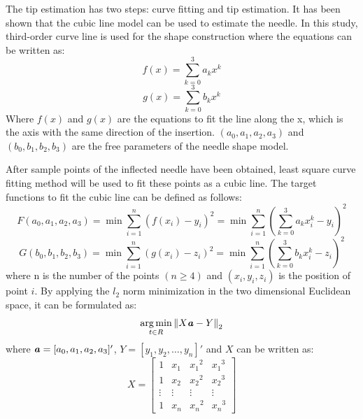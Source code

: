 \documentclass[journal,article,submit,moreauthors,pdftex]{Definitions/mdpi}
\begin{document}
The tip estimation has two steps: curve fitting and tip estimation. It has been shown that the cubic line model can be used to estimate the needle. In this study, third-order curve line is used for the shape construction where the equations can be written as:
\begin{equation}
	f(x)=\sum_{k=0}^{3}a_k x^k
\end{equation}
\begin{equation}
	g(x)=\sum_{k=0}^{3}b_k x^k
\end{equation}
Where ${f(x)}$ and ${g(x)}$ are the equations to fit the line along the x, which is the axis with the same direction of the insertion. ${(a_0,a_1,a_2,a_3)}$ and ${(b_0,b_1,b_2,b_3)}$ are the free parameters of the needle shape model.

After sample points of the inflected needle have been obtained, least square curve fitting method will be used to fit these points as a cubic line. The target functions to fit the cubic line can be defined as follows:
\begin{equation}
	F(a_0,a_1,a_2,a_3)=\min\sum_{i=1}^{n}(f(x_i)-y_i)^2 =\min\sum_{i=1}^{n}(\sum_{k=0}^{3}a_k x_i^k-y_i)^2
\end{equation}
\begin{equation}
	G(b_0,b_1,b_2,b_3)=\min\sum_{i=1}^{n}(g(x_i)-z_i)^2 =\min\sum_{i=1}^{n}(\sum_{k=0}^{3}b_k x_i^k-z_i)^2
\end{equation}
where n is the number of the points ${(n\geq4)}$ and ${(x_i,y_i,z_i)}$ is the position of point ${i}$. By applying the ${l_2}$ norm minimization in the two dimensional Euclidean space, it can be formulated as:
\begin{equation}
	\mathop{\arg\min}_{t\in R} {\|X{\textbf{\textit{a}}}-Y\|}_2
\end{equation}
where ${{\textbf{\textit{a}}}=[a_0,a_1,a_2,a_3]'}$, ${Y=[y_1,y_2,\ldots,y_n]'}$ and ${X}$ can be written as:
\begin{equation}
	X= \begin{bmatrix}
	1&x_1&{x_1}^2&{x_1}^3\\
	1&x_2&{x_2}^2&{x_2}^3\\
	\vdots&\vdots&\vdots&\vdots\\
	1&x_n&{x_n}^2&{x_n}^3
	\end{bmatrix}
\end{equation}
\end{document}
